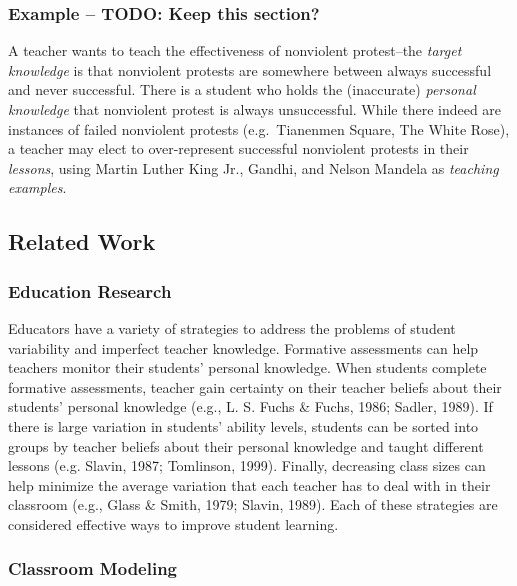 \documentclass[10pt, letterpaper]{article}
\begin{document}
\subsubsection{Example -- TODO: Keep this
section?}\label{example-todo-keep-this-section}

A teacher wants to teach the effectiveness of nonviolent protest--the
\emph{target knowledge} is that nonviolent protests are somewhere
between always successful and never successful. There is a student who
holds the (inaccurate) \emph{personal knowledge} that nonviolent protest
is always unsuccessful. While there indeed are instances of failed
nonviolent protests (e.g.~Tianenmen Square, The White Rose), a teacher
may elect to over-represent successful nonviolent protests in their
\emph{lessons}, using Martin Luther King Jr., Gandhi, and Nelson Mandela
as \emph{teaching examples}.

\subsection{Related Work}\label{related-work}

\subsubsection{Education Research}\label{education-research}

Educators have a variety of strategies to address the problems of
student variability and imperfect teacher knowledge. Formative
assessments can help teachers monitor their students' personal
knowledge. When students complete formative assessments, teacher gain
certainty on their teacher beliefs about their students' personal
knowledge (e.g., L. S. Fuchs \& Fuchs, 1986; Sadler, 1989). If there is
large variation in students' ability levels, students can be sorted into
groups by teacher beliefs about their personal knowledge and taught
different lessons (e.g. Slavin, 1987; Tomlinson, 1999). Finally,
decreasing class sizes can help minimize the average variation that each
teacher has to deal with in their classroom (e.g., Glass \& Smith, 1979;
Slavin, 1989). Each of these strategies are considered effective ways to
improve student learning.

\subsubsection{Classroom Modeling}\label{classroom-modeling}
\end{document}
